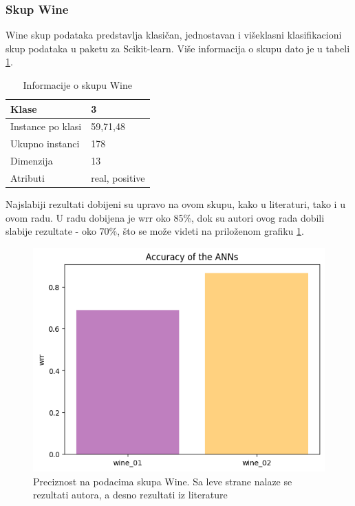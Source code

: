\documentclass[a4paper]{article}
\begin{document}
\subsubsection{Skup Wine}
\label{wine}

Wine skup podataka predstavlja klasičan, jednostavan i višeklasni klasifikacioni skup podataka u paketu za Scikit-learn. Više informacija o skupu dato je u tabeli \ref{table_wine}.

\begin{table}[h!]
\begin{center}
\caption{Informacije o skupu Wine}
\begin{tabular}{|p{4cm}|p{2cm}|}
\hline
Klase             & 3              \\ \hline
Instance po klasi & 59,71,48       \\ \hline
Ukupno instanci   & 178            \\ \hline
Dimenzija         & 13             \\ \hline
Atributi          & real, positive \\ \hline
\end{tabular}\par
\label{table_wine}
\bigskip
\end{center} 
\end{table}

Najslabiji rezultati dobijeni su upravo na ovom skupu, kako u literaturi, tako i u ovom radu. U radu \cite{hindawi} dobijena je 
wrr oko 85\%, dok su autori ovog rada dobili slabije rezultate - oko 70\%, što se može videti na priloženom grafiku \ref{fig:wineslika}. 

\begin{figure}[h!]
\centering
\captionsetup{justification=centering,margin=2cm}
\begin{center}
\includegraphics[scale=0.4]{img/winewrr.png}
\end{center}
\caption{Preciznost na podacima skupa Wine. Sa leve strane nalaze se rezultati autora, a desno rezultati iz literature \cite{hindawi} }
\label{fig:wineslika}
\end{figure}
\end{document}
